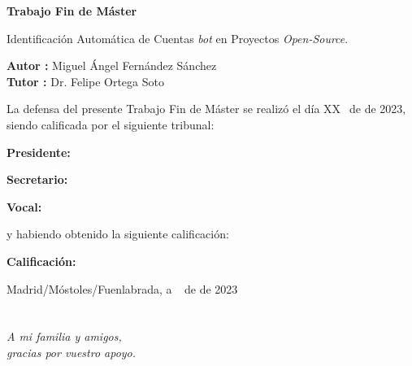 \documentclass[a4paper, 12pt]{book}
\begin{document}
\vspace{-4cm}
\begin{center}
\LARGE
\textbf{Trabajo Fin de Máster}

\vspace{1cm}
\large
Identificación Automática de Cuentas \textit{bot} en Proyectos \textit{Open-Source}.

\vspace{1cm}
\large
\textbf{Autor :} Miguel Ángel Fernández Sánchez \\
\textbf{Tutor :} Dr. Felipe Ortega Soto

\end{center}

\vspace{1cm}
La defensa del presente Trabajo Fin de Máster se realizó el día XX\qquad$\;\,$ de
\qquad\qquad\qquad\qquad \newline de 2023, siendo calificada por el siguiente tribunal:


\vspace{0.5cm}
\textbf{Presidente:}

\vspace{0.8cm}
\textbf{Secretario:}

\vspace{0.8cm}
\textbf{Vocal:}


\vspace{0.8cm}
y habiendo obtenido la siguiente calificación:

\vspace{0.8cm}
\textbf{Calificación:}


\vspace{0.8cm}
\begin{flushright}
Madrid/Móstoles/Fuenlabrada, a \qquad$\;\,$ de \qquad\qquad\qquad\qquad de 2023
\end{flushright}


\chapter*{}
\begin{flushright}
\textit{A mi familia y amigos, \\
gracias por vuestro apoyo.}
\end{flushright}

\vspace{2cm}
\end{document}

